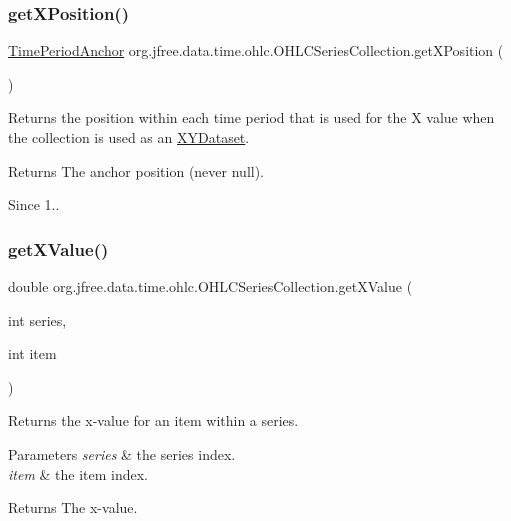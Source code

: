 \subsubsection{\texorpdfstring{get\+X\+Position()}{getXPosition()}}
{\footnotesize\ttfamily \mbox{\hyperlink{classorg_1_1jfree_1_1data_1_1time_1_1_time_period_anchor}{Time\+Period\+Anchor}} org.\+jfree.\+data.\+time.\+ohlc.\+O\+H\+L\+C\+Series\+Collection.\+get\+X\+Position (\begin{DoxyParamCaption}{ }\end{DoxyParamCaption})}

Returns the position within each time period that is used for the X value when the collection is used as an \mbox{\hyperlink{}{X\+Y\+Dataset}}.

\begin{DoxyReturn}{Returns}
The anchor position (never {\ttfamily null}).
\end{DoxyReturn}
\begin{DoxySince}{Since}
1.. 
\end{DoxySince}
\mbox{\label{classorg_1_1jfree_1_1data_1_1time_1_1ohlc_1_1_o_h_l_c_series_collection_a528dc828a917fd0ba0fb959cacbaead1}} 
\subsubsection{\texorpdfstring{get\+X\+Value()}{getXValue()}}
{\footnotesize\ttfamily double org.\+jfree.\+data.\+time.\+ohlc.\+O\+H\+L\+C\+Series\+Collection.\+get\+X\+Value (\begin{DoxyParamCaption}\item[{int}]{series,  }\item[{int}]{item }\end{DoxyParamCaption})}

Returns the x-\/value for an item within a series.


\begin{DoxyParams}{Parameters}
{\em series} & the series index. \\
\hline
{\em item} & the item index.\\
\hline
\end{DoxyParams}
\begin{DoxyReturn}{Returns}
The x-\/value. 
\end{DoxyReturn}


